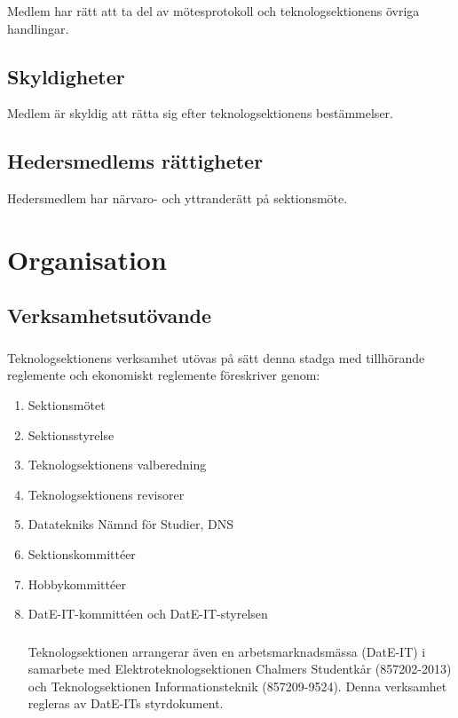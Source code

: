 \documentclass[a4paper]{dtek}
\begin{document}
\subsubsection{}
Medlem har rätt att ta del av mötesprotokoll och teknologsektionens övriga handlingar.
\subsection{Skyldigheter}
Medlem är skyldig att rätta sig efter teknologsektionens bestämmelser.
\subsection{Hedersmedlems rättigheter}
Hedersmedlem har närvaro- och yttranderätt på sektionsmöte.
\newpage

\section{Organisation}
\subsection{Verksamhetsutövande}
\subsubsection{}
Teknologsektionens verksamhet utövas på sätt denna stadga med tillhörande reglemente och ekonomiskt reglemente föreskriver genom:
\begin{enumerate}
\item Sektionsmötet
\item Sektionsstyrelse
\item Teknologsektionens valberedning
\item Teknologsektionens revisorer
\item Datatekniks Nämnd för Studier, DNS
\item Sektionskommittéer
\item Hobbykommittéer
\item DatE-IT-kommittéen och DatE-IT-styrelsen

\subsubsection{}
Teknologsektionen arrangerar även en arbetsmarknadsmässa (DatE-IT) i samarbete med Elektroteknologsektionen Chalmers Studentkår (857202-2013) och Teknologsektionen Informationsteknik (857209-9524). Denna verksamhet regleras av DatE-ITs styrdokument. 
  
\end{enumerate}
\end{document}
